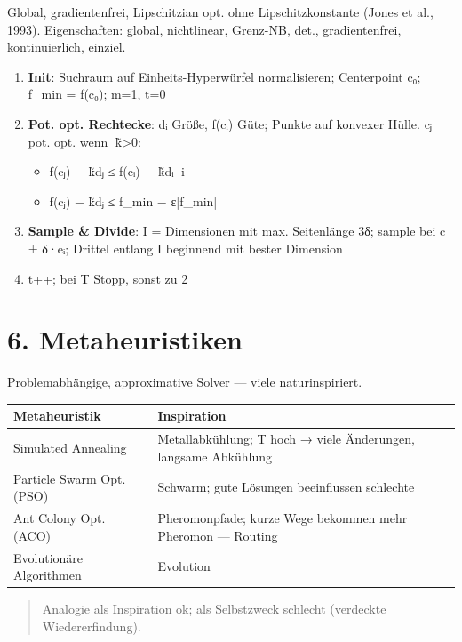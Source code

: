 \documentclass[11pt, a4paper]{article}
\begin{document}
Global, gradientenfrei, Lipschitzian opt. ohne Lipschitzkonstante (Jones et al., 1993). Eigenschaften: global, nichtlinear, Grenz-NB, det., gradientenfrei, kontinuierlich, einziel.


\begin{enumerate}
  \item \textbf{Init}: Suchraum auf Einheits-Hyperwürfel normalisieren; Centerpoint c⃗₀; f\_min = f(c⃗₀); m=1, t=0
  \item \textbf{Pot. opt. Rechtecke}: dᵢ Größe, f(c⃗ᵢ) Güte; Punkte auf konvexer Hülle. c⃗ⱼ pot. opt. wenn ∃k̃>0:
\begin{itemize}
  \item f(c⃗ⱼ) − k̃dⱼ ≤ f(c⃗ᵢ) − k̃dᵢ ∀i
  \item f(c⃗ⱼ) − k̃dⱼ ≤ f\_min − ε|f\_min|
\end{itemize}
  \item \textbf{Sample \& Divide}: I = Dimensionen mit max. Seitenlänge 3δ; sample bei c⃗ ± δ·e⃗ᵢ; Drittel entlang I beginnend mit bester Dimension
  \item t++; bei T Stopp, sonst zu 2
\end{enumerate}


\section{6. Metaheuristiken}

Problemabhängige, approximative Solver — viele naturinspiriert.



{\small
\begin{tabularx}{\linewidth}{XX}
\hline
\rowcolor{tableheadbg}
{\color{white}\textbf{Metaheuristik}} & {\color{white}\textbf{Inspiration}} \\[2pt]
\hline
\endhead
\hline
\endfoot
Simulated Annealing & Metallabkühlung; T hoch → viele Änderungen, langsame Abkühlung \\
Particle Swarm Opt. (PSO) & Schwarm; gute Lösungen beeinflussen schlechte \\
Ant Colony Opt. (ACO) & Pheromonpfade; kurze Wege bekommen mehr Pheromon — Routing \\
Evolutionäre Algorithmen & Evolution \\
\end{tabularx}
}


\begin{quote}
Analogie als Inspiration ok; als Selbstzweck schlecht (verdeckte Wiedererfindung).
\end{quote}
\end{document}
